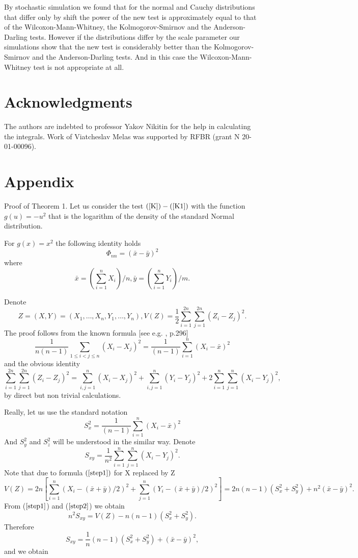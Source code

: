 \documentclass{svproc}
\begin{document}
By stochastic simulation we found that for the normal and Cauchy distributions that differ only by shift the power of the new test is approximately equal to that of the Wilcoxon-Mann-Whitney, the Kolmogorov-Smirnov and the Anderson-Darling tests. However if the distributions differ by the scale parameter our simulations show that the new test is considerably better than the Kolmogorov-Smirnov and the Anderson-Darling tests. And in this case the Wilcoxon-Mann-Whitney test is not appropriate at all.

\section*{Acknowledgments}
The authors are indebted to professor Yakov Nikitin for the help in calculating the  integrals. Work of Viatcheslav Melas was supported by RFBR (grant N 20-01-00096).

\section{Appendix}
Proof of Theorem 1.
Let us consider the test $(\ref{K})-(\ref{K1})$ with the function $g(u)=-u^2$ that is the logarithm of the density of the standard Normal distribution.


\begin{lemma} For $g(x)= x^2$ the following identity holds
$$
\Phi_{nn}= (\bar x - \bar y)^2
$$
where
$$
\bar x = (\sum_{i=1}^n X_i)/n,
\bar y = (\sum_{i=1}^n Y_i)/m.
$$
\end{lemma}
Denote
$$ 
 Z=(X,Y)= (X_1,\dots, X_n,Y_1,\dots, Y_n),
V(Z)=\frac{1}{2}\sum_{i=1}^{2n}\sum_{j=1}^{2n} (Z_i-Z_j)^2.
$$
The proof follows from the known formula [see e.g. \cite{Hoeffding}, p.296]
\begin{equation}\label{step1} 
\frac {1}{n(n-1)}\sum_{1\leq i<j\leq n
} (X_i-X_j)^2=\frac {1}{(n-1)} \sum_{i=1}^n (X_i - \bar x)^2
\end{equation}
and the obvious identity
\begin{equation}\label{step2}
\sum_{i=1}^{2n}\sum_{j=1}^{2n} (Z_i-Z_j)^2=\sum_{i,j=1}^n(X_i-X_j)^2+
\sum_{i,j=1}^n (Y_i-Y_j)^2+2\sum_{i=1}^n\sum_{j=1}^n (X_i-Y_j)^2,
\end{equation}
by  direct but non trivial  calculations. 

Really, let us use the standard notation
$$
S_x^2=\frac {1}{(n-1)} \sum_{i=1}^n (X_i - \bar x)^2
$$
And  $S_y^2$ and $S_z^2$ will be understood in the similar way.
Denote 
$$
S_{xy}=\frac{1}{n^2}\sum_{i=1}^n\sum_{j=1}^n (X_i-Y_j)^2.
$$
Note that due to formula $(\ref{step1})$ for X replaced by Z
\begin{equation}\label{step3a}
V(Z)=2n[\sum_{i=1}^n(X_i- (\bar x + \bar y)/2)^2 +\sum_{j=1}^n(Y_i- (\bar x + \bar y)/2)^2] = 2n(n-1) (S_x^2 + S_y^2) +n^2(\bar x- \bar y)^2.
\end{equation}
From ($\ref{step1}$) and  ($\ref{step2}$) we obtain
\begin{equation}\label{step3}
n^2S_{xy}=V(Z)-n(n-1)(S_x^2+S_y^2).
\end{equation}
Therefore
$$
S_{xy} =\frac{1}{n}(n-1)(S_x^2+S_y^2)+ (\bar x-\bar y)^2,
$$
and we obtain
\end{document}
